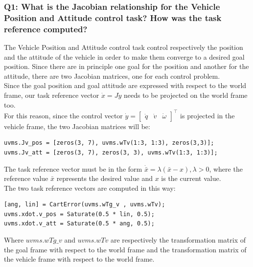 \documentclass{article}
\begin{document}
\subsubsection{Q1: What is the Jacobian relationship for the Vehicle Position and Attitude control task? How was the task reference computed?}
The Vehicle Position and Attitude control task control respectively the position and the attitude of the vehicle in order to make them converge to a desired goal position. Since there are in principle one goal for the position and another for the attitude, there are two Jacobian matrices, one for each control problem. \\
Since the goal position and goal attitude are expressed with respect to the world frame, our task reference vector $ \dot{x} = J\dot{y} $ needs to be projected on the world frame too. \\
For this reason, since the control vector $ \dot{y} = \begin{bmatrix} \dot{q} & \dot{v} & \dot{\omega}\end{bmatrix}^\top $ is projected in the vehicle frame, the two Jacobian matrices will be:
\begin{lstlisting}
uvms.Jv_pos = [zeros(3, 7), uvms.wTv(1:3, 1:3), zeros(3,3)]; 
uvms.Jv_att = [zeros(3, 7), zeros(3, 3), uvms.wTv(1:3, 1:3)];
\end{lstlisting}
The task reference vector must be in the form $ \dot{\bar{x}} = \lambda(\bar{x} - x), \lambda > 0 $, where the reference value $ \bar{x} $ represents the desired value and $ x $ is the current value. \\
The two task reference vectors are computed in this way:
\begin{lstlisting}
[ang, lin] = CartError(uvms.wTg_v , uvms.wTv);
uvms.xdot.v_pos = Saturate(0.5 * lin, 0.5);
uvms.xdot.v_att = Saturate(0.5 * ang, 0.5);
\end{lstlisting}
Where $ uvms.wTg\_v $ and $ uvms.wTv $ are respectively the transformation matrix of the goal frame with respect to the world frame and the transformation matrix of the vehicle frame with respect to the world frame. 
\end{document}
